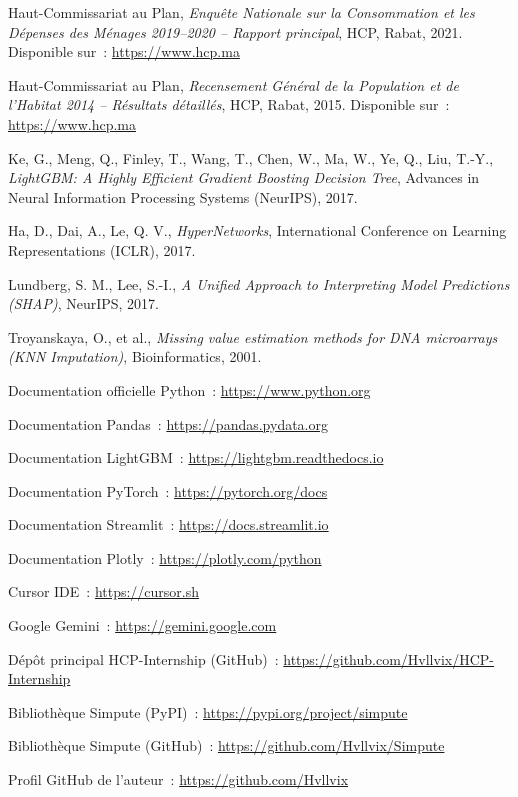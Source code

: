 \documentclass[12pt,a4paper]{report}
\begin{document}
\begin{enumerate}[label={[\arabic*]}, leftmargin=1.8cm]
  \item Haut-Commissariat au Plan, \textit{Enquête Nationale sur la Consommation et les Dépenses des Ménages 2019--2020 -- Rapport principal}, HCP, Rabat, 2021. Disponible sur~: \url{https://www.hcp.ma}
  \item Haut-Commissariat au Plan, \textit{Recensement Général de la Population et de l'Habitat 2014 -- Résultats détaillés}, HCP, Rabat, 2015. Disponible sur~: \url{https://www.hcp.ma}
  \item Ke, G., Meng, Q., Finley, T., Wang, T., Chen, W., Ma, W., Ye, Q., Liu, T.-Y., \textit{LightGBM: A Highly Efficient Gradient Boosting Decision Tree}, Advances in Neural Information Processing Systems (NeurIPS), 2017.
  \item Ha, D., Dai, A., Le, Q. V., \textit{HyperNetworks}, International Conference on Learning Representations (ICLR), 2017.
  \item Lundberg, S. M., Lee, S.-I., \textit{A Unified Approach to Interpreting Model Predictions (SHAP)}, NeurIPS, 2017.
  \item Troyanskaya, O., et al., \textit{Missing value estimation methods for DNA microarrays (KNN Imputation)}, Bioinformatics, 2001.
  \item Documentation officielle Python~: \url{https://www.python.org}
  \item Documentation Pandas~: \url{https://pandas.pydata.org}
  \item Documentation LightGBM~: \url{https://lightgbm.readthedocs.io}
  \item Documentation PyTorch~: \url{https://pytorch.org/docs}
  \item Documentation Streamlit~: \url{https://docs.streamlit.io}
  \item Documentation Plotly~: \url{https://plotly.com/python}
  \item Cursor IDE~: \url{https://cursor.sh}
  \item Google Gemini~: \url{https://gemini.google.com}
  \item Dépôt principal HCP-Internship (GitHub)~: \url{https://github.com/Hvllvix/HCP-Internship}
  \item Bibliothèque Simpute (PyPI)~: \url{https://pypi.org/project/simpute}
  \item Bibliothèque Simpute (GitHub)~: \url{https://github.com/Hvllvix/Simpute}
  \item Profil GitHub de l'auteur~: \url{https://github.com/Hvllvix}
\end{enumerate}
\end{document}
